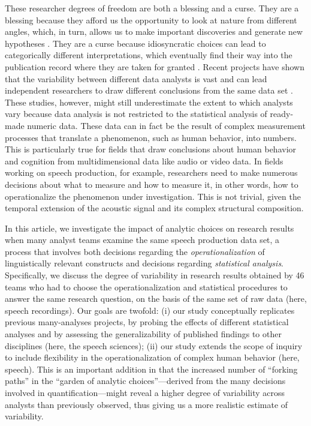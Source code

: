\documentclass[Review,times,sageh]{sagej}
\begin{document}
These researcher degrees of freedom are both a blessing and a curse.
They are a blessing because they afford us the opportunity to look at nature from different angles, which, in turn, allows us to make important discoveries and generate new hypotheses \citep[e.g.,][]{box1976science, tukey1977exploratory, de2014thought}.
They are a curse because idiosyncratic choices can lead to categorically different interpretations, which eventually find their way into the publication record where they are taken for granted \citep{simmons2011false}.
Recent projects have shown that the variability between different data analysts is vast and can lead independent researchers to draw different conclusions from the same data set \citep[e.g.,][]{silberzahn2018many, starns2019assessing, botvinik-nezer2020}.
These studies, however, might still underestimate the extent to which analysts vary because data analysis is not restricted to the statistical analysis of ready-made numeric data.
These data can in fact be the result of complex measurement processes that translate a phenomenon, such as human behavior, into numbers.
This is particularly true for fields that draw conclusions about human behavior and cognition from multidimensional data like audio or video data.
In fields working on speech production, for example, researchers need to make numerous decisions about what to measure and how to measure it, in other words, how to operationalize the phenomenon under investigation.
This is not trivial, given the temporal extension of the acoustic signal and its complex structural composition.

In this article, we investigate the impact of analytic choices on research results when many analyst teams examine the same speech production data set, a process that involves both decisions regarding the \emph{operationalization} of linguistically relevant constructs and decisions regarding \emph{statistical analysis}.
Specifically, we discuss the degree of variability in research results obtained by 46 teams who had to choose the operationalization and statistical procedures to answer the same research question, on the basis of the same set of raw data (here, speech recordings).
Our goals are twofold: (i) our study conceptually replicates previous many-analyses projects, by probing the effects of different statistical analyses and by assessing the generalizability of published findings to other disciplines (here, the speech sciences);
(ii) our study extends the scope of inquiry to include flexibility in the operationalization of complex human behavior (here, speech).
This is an important addition in that the increased number of ``forking paths'' in the ``garden of analytic choices''---derived from the many decisions involved in quantification---might reveal a higher degree of variability across analysts than previously observed, thus giving us a more realistic estimate of variability.
\end{document}
